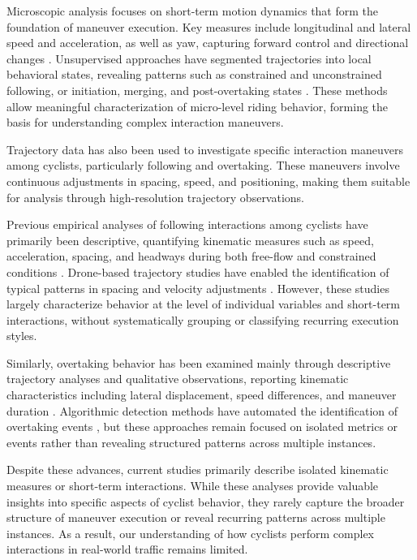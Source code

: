 Microscopic analysis focuses on short-term motion dynamics that form the foundation of maneuver execution. Key measures include longitudinal and lateral speed and acceleration, as well as yaw, capturing forward control and directional changes \cite{arvin_how_2019, arvin_safety_2021, bachir_identifying_2025, li_volatility-based_2025, wang_what_2015, yarlagadda_exploring_2022}. Unsupervised approaches have segmented trajectories into local behavioral states, revealing patterns such as constrained and unconstrained following, or initiation, merging, and post-overtaking states \cite{mohammed_characterization_2019, yarlagadda_exploring_2022, bachir_identifying_2025, li_volatility-based_2025, zhang_proactive_2023}. These methods allow meaningful characterization of micro-level riding behavior, forming the basis for understanding complex interaction maneuvers.


Trajectory data has also been used to investigate specific interaction maneuvers among cyclists, particularly following and overtaking. These maneuvers involve continuous adjustments in spacing, speed, and positioning, making them suitable for analysis through high-resolution trajectory observations.

Previous empirical analyses of following interactions among cyclists have primarily been descriptive, quantifying kinematic measures such as speed, acceleration, spacing, and headways during both free-flow and constrained conditions \cite{hoogendoorn_bicycle_2016, zhao_unified_2017}. Drone-based trajectory studies have enabled the identification of typical patterns in spacing and velocity adjustments \cite{dias_exploring_2023,kutsch_analyzing_2025}. However, these studies largely characterize behavior at the level of individual variables and short-term interactions, without systematically grouping or classifying recurring execution styles.

Similarly, overtaking behavior has been examined mainly through descriptive trajectory analyses and qualitative observations, reporting kinematic characteristics including lateral displacement, speed differences, and maneuver duration \cite{kutsch_analyzing_2025}. Algorithmic detection methods have automated the identification of overtaking events \cite{feng_automatic_2023}, but these approaches remain focused on isolated metrics or events rather than revealing structured patterns across multiple instances.


Despite these advances, current studies primarily describe isolated kinematic measures or short-term interactions. While these analyses provide valuable insights into specific aspects of cyclist behavior, they rarely capture the broader structure of maneuver execution or reveal recurring patterns across multiple instances. As a result, our understanding of how cyclists perform complex interactions in real-world traffic remains limited.

